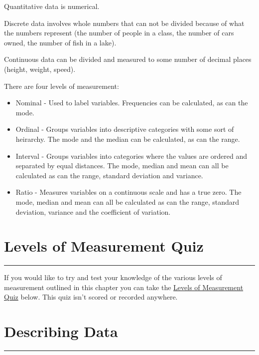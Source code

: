 \documentclass[
]{book}
\begin{document}
Quantitative data is numerical.

Discrete data involves whole numbers that can not be divided because of what the numbers represent (the number of people in a class, the number of cars owned, the number of fish in a lake).

Continuous data can be divided and measured to some number of decimal places (height, weight, speed).

There are four levels of measurement:

\begin{itemize}
\item
  Nominal - Used to label variables. Frequencies can be calculated, as can the mode.
\item
  Ordinal - Groups variables into descriptive categories with some sort of heirarchy. The mode and the median can be calculated, as can the range.
\item
  Interval - Groups variables into categories where the values are ordered and separated by equal distances. The mode, median and mean can all be calculated as can the range, standard deviation and variance.
\item
  Ratio - Measures variables on a continuous scale and has a true zero. The mode, median and mean can all be calculated as can the range, standard deviation, variance and the coefficient of variation.
\end{itemize}

\hypertarget{quizone}{%
\chapter{Levels of Measurement Quiz}\label{quizone}}

\begin{center}\rule{0.5\linewidth}{0.5pt}\end{center}

If you would like to try and test your knowledge of the various levels of measurement outlined in this chapter you can take the \href{https://view.genial.ly/62867083cd8fd700184ca06f/presentation-quiz}{Levels of Measurement Quiz} below. This quiz isn't scored or recorded anywhere.

\hypertarget{descdata}{%
\chapter{Describing Data}\label{descdata}}

\begin{center}\rule{0.5\linewidth}{0.5pt}\end{center}
\end{document}

